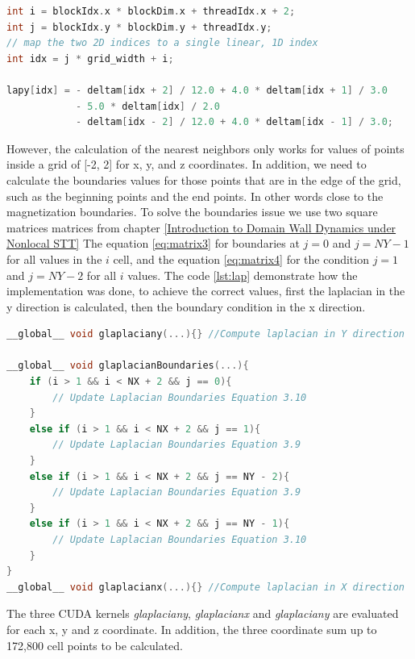 \begin{lstlisting}[language=C++, label={lst:lpay}, caption={Laplacian X using global memory}]
int i = blockIdx.x * blockDim.x + threadIdx.x + 2;
int j = blockIdx.y * blockDim.y + threadIdx.y;
// map the two 2D indices to a single linear, 1D index
int idx = j * grid_width + i;

lapy[idx] = - deltam[idx + 2] / 12.0 + 4.0 * deltam[idx + 1] / 3.0
			- 5.0 * deltam[idx] / 2.0
			- deltam[idx - 2] / 12.0 + 4.0 * deltam[idx - 1] / 3.0;	
\end{lstlisting}


However, the calculation of the nearest neighbors only works for values of points inside a grid of [-2, 2] for x, y, and z coordinates. In addition, we need to calculate the boundaries values for those points that are in the edge of the grid, such as the beginning points and the end points. In other words close to the magnetization boundaries. To solve the boundaries issue we use two square matrices matrices from chapter \ref{Introduction to Domain Wall Dynamics under Nonlocal STT}  The equation \ref{eq:matrix3} for boundaries at $j = 0$ and $j = NY - 1$ for all values in the $i$ cell, and the equation \ref{eq:matrix4} for the condition $j = 1$ and $j = NY - 2$ for all $i$ values. The code \ref{lst:lap} demonstrate how the implementation was done, to achieve the correct values, first the laplacian in the y direction is calculated, then the boundary condition in the x direction. 

\begin{lstlisting}[language=C++, label={lst:lap}, caption={Evaluation of Laplacian X, Y with boundary condition}]
__global__ void glaplaciany(...){} //Compute laplacian in Y direction

__global__ void glaplacianBoundaries(...){
    if (i > 1 && i < NX + 2 && j == 0){
     	// Update Laplacian Boundaries Equation 3.10
    }
    else if (i > 1 && i < NX + 2 && j == 1){
  		// Update Laplacian Boundaries Equation 3.9
    }
    else if (i > 1 && i < NX + 2 && j == NY - 2){
        // Update Laplacian Boundaries Equation 3.9
    }
    else if (i > 1 && i < NX + 2 && j == NY - 1){
        // Update Laplacian Boundaries Equation 3.10
    }
}
__global__ void glaplacianx(...){} //Compute laplacian in X direction
\end{lstlisting}

The three CUDA kernels \textit{glaplaciany}, \textit{glaplacianx} and \textit{glaplaciany} are evaluated for each x, y and z coordinate. In addition, the three coordinate sum up to 172,800 cell points to be calculated.


